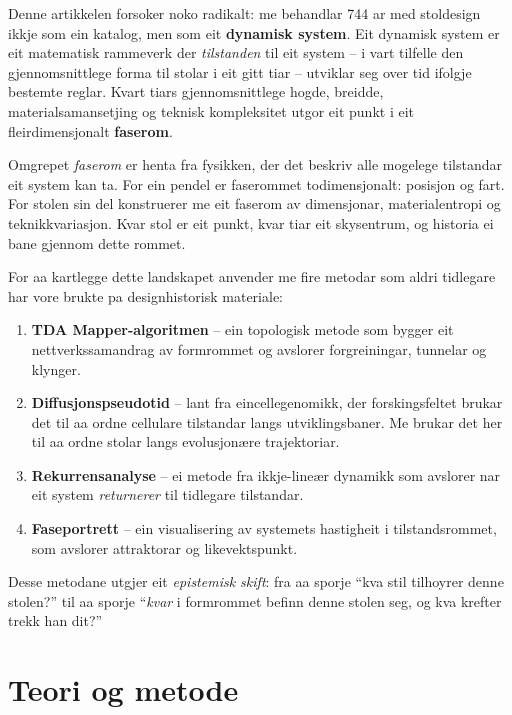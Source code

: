 \documentclass[10pt, a4paper, twocolumn]{article}
\begin{document}
Denne artikkelen forsok\-er noko radikalt: me behandlar 744 ar med stoldesign ikkje som ein katalog, men som eit \textbf{dynamisk system}. Eit dynamisk system er eit matematisk rammeverk der \emph{tilstanden} til eit system -- i vart tilfelle den gjennomsnittlege forma til stolar i eit gitt tiar -- utviklar seg over tid ifol\-gje bestemte reglar. Kvart tiar\-s gjennomsnittlege hogde, breidde, materialsamansetjing og teknisk kompleksitet utgor eit punkt i eit fleirdimensjonalt \textbf{faserom}.

Omgrepet \emph{faserom} er henta fra fysikken, der det beskriv alle mogelege tilstandar eit system kan ta. For ein pendel er faserommet todimensjonalt: posisjon og fart. For stolen sin del konstruerer me eit faserom av dimensjonar, materialentropi og teknikkvariasjon. Kvar stol er eit punkt, kvar tiar eit skysentrum, og historia ei bane gjennom dette rommet.

For aa kartlegge dette landskapet anvender me fire metodar som aldri tidlegare har vore brukte pa designhistorisk materiale:

\begin{enumerate}[leftmargin=*, topsep=3pt, itemsep=2pt]
  \item \textbf{TDA Mapper-algoritmen} -- ein topologisk metode som bygger eit nettverkssamandrag av formrommet og avslorer forgreiningar, tunnelar og klynger.
  \item \textbf{Diffusjonspseudotid} -- lant fra eincellegenomikk, der forskingsfeltet brukar det til aa ordne cellulare tilstandar langs utviklingsbaner. Me brukar det her til aa ordne stolar langs evolusjon\ae{}re trajektoriar.
  \item \textbf{Rekurrensanalyse} -- ei metode fra ikkje-line\ae{}r dynamikk som avslorer nar eit system \emph{returnerer} til tidlegare tilstandar.
  \item \textbf{Faseportrett} -- ein visualisering av systemets hastigheit i tilstandsrommet, som avslorer attraktorar og likevektspunkt.
\end{enumerate}

Desse metodane utgjer eit \emph{epistemisk skift}: fra aa sporje ``kva stil tilhoyr\-er denne stolen?'' til aa sporje ``\emph{kvar} i formrommet befinn denne stolen seg, og kva krefter trekk han dit?''


\section{Teori og metode}
\end{document}
